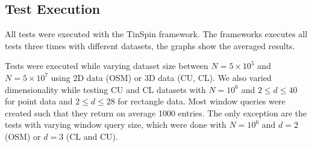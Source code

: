 \documentclass{vldb}
\newcommand{\todo}[1]{\textbf{\textcolor{todocolor}{#1}}}
\begin{document}
%
%
%
%

%




\subsection{Test Execution}

All tests were executed with the TinSpin framework. The frameworks executes all tests three times with different datasets, the graphs show the averaged results. 

Tests were executed while varying dataset size between $N = 5 \times 10^5$ and $N = 5 \times 10^7$ using 2D data (OSM) or 3D data (CU, CL). We also varied
dimensionality while testing CU and CL datasets with $N = 10^6$ and $2 \leq d \leq 40$ for point data and
$2 \leq d \leq 28$ for rectangle data.
Most window queries were created such that they return on average 1000 entries. The only exception are the tests with varying window query size, which were done with $N=10^6$ and $d=2$ (OSM) or $d=3$ (CL and CU).
\end{document}
